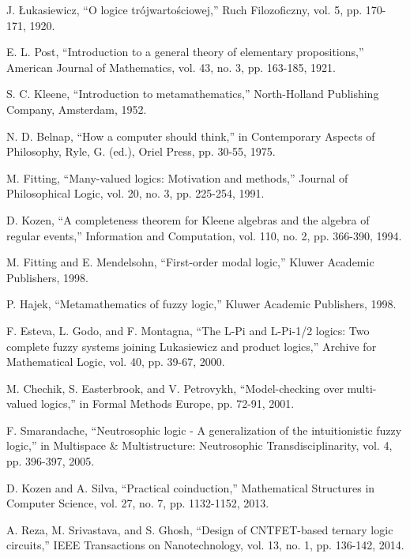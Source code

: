 \documentclass[11pt,a4paper]{article}
\begin{document}

\begin{thebibliography}{99}

J. Łukasiewicz, ``O logice trójwartościowej,'' Ruch Filozoficzny, vol. 5, pp. 170-171, 1920.

E. L. Post, ``Introduction to a general theory of elementary propositions,'' American Journal of Mathematics, vol. 43, no. 3, pp. 163-185, 1921.

S. C. Kleene, ``Introduction to metamathematics,'' North-Holland Publishing Company, Amsterdam, 1952.

N. D. Belnap, ``How a computer should think,'' in Contemporary Aspects of Philosophy, Ryle, G. (ed.), Oriel Press, pp. 30-55, 1975.

M. Fitting, ``Many-valued logics: Motivation and methods,'' Journal of Philosophical Logic, vol. 20, no. 3, pp. 225-254, 1991.

D. Kozen, ``A completeness theorem for Kleene algebras and the algebra of regular events,'' Information and Computation, vol. 110, no. 2, pp. 366-390, 1994.

M. Fitting and E. Mendelsohn, ``First-order modal logic,'' Kluwer Academic Publishers, 1998.

P. Hajek, ``Metamathematics of fuzzy logic,'' Kluwer Academic Publishers, 1998.

F. Esteva, L. Godo, and F. Montagna, ``The L-Pi and L-Pi-1/2 logics: Two complete fuzzy systems joining Lukasiewicz and product logics,'' Archive for Mathematical Logic, vol. 40, pp. 39-67, 2000.

M. Chechik, S. Easterbrook, and V. Petrovykh, ``Model-checking over multi-valued logics,'' in Formal Methods Europe, pp. 72-91, 2001.

F. Smarandache, ``Neutrosophic logic - A generalization of the intuitionistic fuzzy logic,'' in Multispace \& Multistructure: Neutrosophic Transdisciplinarity, vol. 4, pp. 396-397, 2005.

D. Kozen and A. Silva, ``Practical coinduction,'' Mathematical Structures in Computer Science, vol. 27, no. 7, pp. 1132-1152, 2013.

A. Reza, M. Srivastava, and S. Ghosh, ``Design of CNTFET-based ternary logic circuits,'' IEEE Transactions on Nanotechnology, vol. 13, no. 1, pp. 136-142, 2014.


\end{thebibliography}
\end{document}
